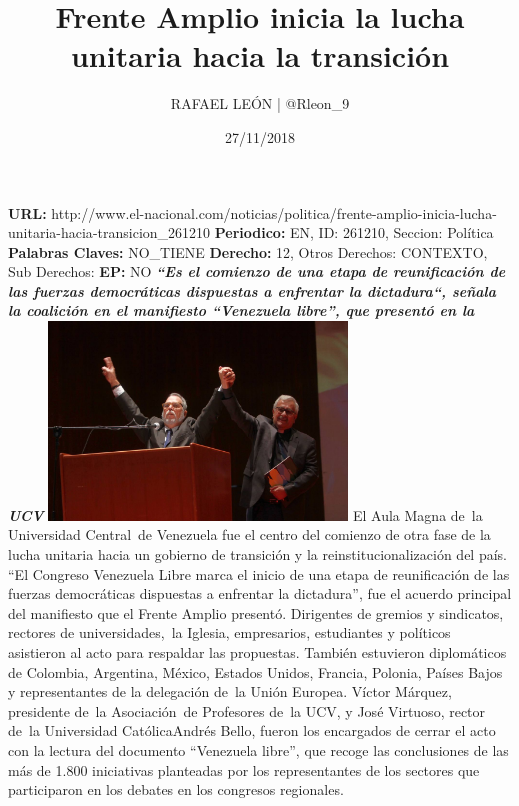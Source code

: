 \documentclass{article}%
\title{\textbf{Frente Amplio inicia la lucha unitaria hacia la transición}}%
\author{RAFAEL LEÓN | @Rleon\_9}%
\date{27/11/2018}%
\begin{document}
%
\normalsize%
\maketitle%
\textbf{URL: }%
http://www.el{-}nacional.com/noticias/politica/frente{-}amplio{-}inicia{-}lucha{-}unitaria{-}hacia{-}transicion\_261210\newline%
%
\textbf{Periodico: }%
EN, %
ID: %
261210, %
Seccion: %
Política\newline%
%
\textbf{Palabras Claves: }%
NO\_TIENE\newline%
%
\textbf{Derecho: }%
12, %
Otros Derechos: %
CONTEXTO, %
Sub Derechos: %
\newline%
%
\textbf{EP: }%
NO\newline%
\newline%
%
\textbf{\textit{“Es el comienzo de una etapa de reunificación de las fuerzas democráticas dispuestas a enfrentar la dictadura“, señala la coalición en el manifiesto “Venezuela libre”, que presentó en la UCV}}%
\newline%
\newline%
%
\includegraphics[width=300px]{140.jpg}%
\newline%
%
El Aula Magna de~la Universidad Central~de Venezuela fue el centro del comienzo de otra fase de la lucha unitaria hacia un gobierno de transición y la reinstitucionalización del país. “El Congreso Venezuela Libre marca el inicio de una etapa de reunificación de las fuerzas democráticas dispuestas a enfrentar la dictadura”, fue el acuerdo principal del manifiesto que el Frente Amplio presentó.%
\newline%
%
Dirigentes de gremios y sindicatos, rectores de universidades,~la Iglesia, empresarios, estudiantes y políticos asistieron al acto para respaldar las propuestas. También estuvieron diplomáticos de Colombia, Argentina, México, Estados Unidos, Francia, Polonia, Países Bajos y representantes de la delegación de~la Unión Europea.%
\newline%
%
Víctor Márquez, presidente de~la Asociación~de Profesores de~la UCV, y José Virtuoso, rector de~la Universidad CatólicaAndrés Bello, fueron los encargados de cerrar el acto con la lectura del documento “Venezuela libre”, que recoge las conclusiones de las más de 1.800 iniciativas planteadas por los representantes de los sectores que participaron en los debates en los congresos regionales.%
\end{document}
